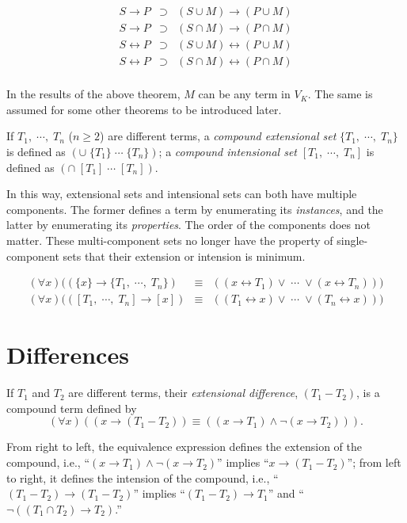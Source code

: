 \begin{theo}
\[\begin{array}{rcl}
S \rightarrow P & \supset & (S \cup M) \rightarrow (P \cup M) \\
S \rightarrow P & \supset & (S \cap M) \rightarrow (P \cap M) \\
S \leftrightarrow P & \supset & (S \cup M) \leftrightarrow (P \cup M) \\
S \leftrightarrow P & \supset & (S \cap M) \leftrightarrow (P \cap M) \\
\end{array}\]
\end{theo}
In the results of the above theorem, $M$ can be any term in $V_K$.  The same is assumed for some other theorems to be introduced later.

\begin{defi}
If \(T_1, \; \cdots, \; T_n\) ($n \geq 2$) are different terms, a \emph{compound extensional set} \(\{T_1, \; \cdots , \; T_n\}\) is defined as \((\cup \; \{T_1\} \; \cdots \; \{T_n\})\); a \emph{compound intensional set} \([T_1, \; \cdots , \; T_n]\) is defined as \((\cap \; [T_1] \; \cdots \; [T_n])\).  
\end{defi}
In this way, extensional sets and intensional sets can both have multiple components.  The former defines a term by enumerating its \emph{instances}, and the latter by enumerating its \emph{properties}.  The order of the components does not matter. These multi-component sets no longer have the property of single-component sets that their extension or intension is minimum.

\begin{theo}
\[\begin{array}{ccc}
(\forall x) ((\{x\} \rightarrow \{T_1, \; \cdots , \; T_n\}) & \equiv & ((x  \leftrightarrow T_1) \vee \; \cdots \; \vee (x \leftrightarrow T_n))) \\
(\forall x) (([T_1, \; \cdots , \; T_n] \rightarrow [x]) & \equiv & ((T_1\leftrightarrow x) \vee \; \cdots \; \vee (T_n \leftrightarrow x)))
\end{array}\]
\end{theo}

\section{Differences}

\begin{defi}
If $T_1$ and $T_2$ are different terms, their {\em extensional difference}, $(T_1 - T_2)$, is a compound term defined by
\[(\forall x) ((x \rightarrow (T_1 - T_2)) \equiv ((x \rightarrow T_1) \wedge \neg(x \rightarrow T_2))).\]
\end{defi}
From right to left, the equivalence expression defines the extension of the compound, i.e., ``\((x \rightarrow T_1) \wedge \neg(x \rightarrow T_2)\)'' implies ``\(x \rightarrow (T_1 - T_2)\)''; from left to right, it defines the intension of the compound, i.e., ``\((T_1 - T_2) \rightarrow (T_1 - T_2)\)'' implies ``\((T_1 - T_2) \rightarrow T_1\)'' and ``\(\neg((T_1 \cap T_2) \rightarrow T_2)\).''

